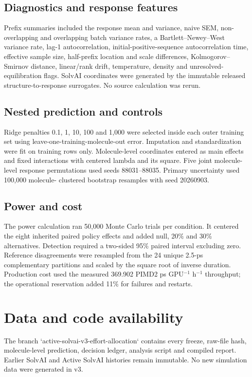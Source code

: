 \documentclass[11pt]{article}
\begin{document}
\subsection{Diagnostics and response features}

Prefix summaries included the response mean and variance, naive SEM,
non-overlapping and overlapping batch variance rates, a Bartlett--Newey--West variance
rate, lag-1 autocorrelation, initial-positive-sequence autocorrelation time, effective
sample size, half-prefix location and scale differences, Kolmogorov--Smirnov distance,
linear/rank drift, temperature, density and unresolved-equilibration flags. SolvAI
coordinates were generated by the immutable released structure-to-response surrogates.
No source calculation was rerun.

\subsection{Nested prediction and controls}

Ridge penalties 0.1, 1, 10, 100 and 1,000 were selected inside each outer training set
using leave-one-training-molecule-out error. Imputation and standardization were fit on
training rows only. Molecule-level coordinates entered as main effects and fixed
interactions with centered lambda and its square. Five joint molecule-level response
permutations used seeds 88031--88035. Primary uncertainty used 100,000 molecule-
clustered bootstrap resamples with seed 20260903.

\subsection{Power and cost}

The power calculation ran 50,000 Monte Carlo trials per condition. It centered the
eight inherited paired policy effects and added null, 20\% and 30\% alternatives.
Detection required a two-sided 95\% paired interval excluding zero. Reference
disagreements were resampled from the 24 unique 2.5-ps complementary partitions and
scaled by the square root of inverse duration. Production cost used the measured
369.902 PIMD2 ps GPU$^{-1}$ h$^{-1}$ throughput; the operational reservation added
11\% for failures and restarts.

\section*{Data and code availability}

The branch `active-solvai-v3-effort-allocation` contains every freeze, raw-file hash,
molecule-level prediction, decision ledger, analysis script and compiled report.
Earlier SolvAI and Active SolvAI histories remain immutable. No new simulation data
were generated in v3.
\end{document}
